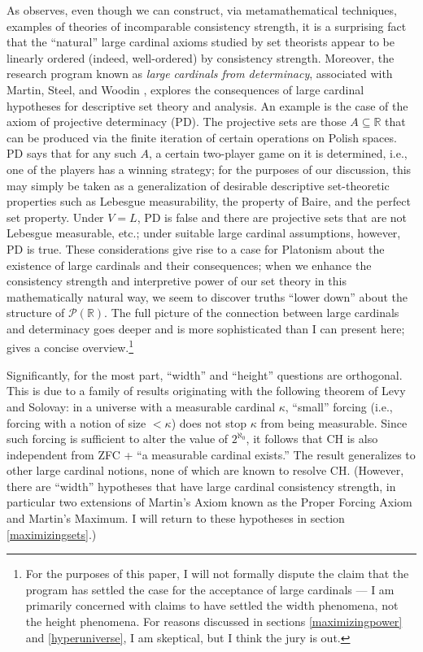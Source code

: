 \documentclass[letterpaper,12pt]{article}
\newcommand{\R}{\mathbb{R}}
\begin{document}
As \cite{sep-independence-large-cardinals} observes, even though we can construct, via metamathematical techniques, examples of theories of incomparable consistency strength, it is a surprising fact that the ``natural'' large cardinal axioms studied by set theorists appear to be linearly ordered (indeed, well-ordered) by consistency strength. Moreover, the research program known as \emph{large cardinals from determinacy}, associated with Martin, Steel, and Woodin \citep{koellner2010large}, explores the consequences of large cardinal hypotheses for descriptive set theory and analysis. An example is the case of the axiom of projective determinacy (PD). The projective sets are those $A \subseteq \R$ that can be produced via the finite iteration of certain operations on Polish spaces. PD says that for any such $A$, a certain two-player game on it is determined, i.e., one of the players has a winning strategy; for the purposes of our discussion, this may simply be taken as a generalization of desirable descriptive set-theoretic properties such as Lebesgue measurability, the property of Baire, and the perfect set property. Under $V = L$, PD is false and there are projective sets that are not Lebesgue measurable, etc.; under suitable large cardinal assumptions, however, PD is true. These considerations give rise to a case for Platonism about the existence of large cardinals and their consequences; when we enhance the consistency strength and interpretive power of our set theory in this mathematically natural way, we seem to discover truths ``lower down'' about the structure of $\mathcal{P}(\R)$. The full picture of the connection between large cardinals and determinacy goes deeper and is more sophisticated than I can present here; \cite{sep-large-cardinals-determinacy} gives a concise overview.\footnote{For the purposes of this paper, I will not formally dispute the claim that the program has settled the case for the acceptance of large cardinals --- I am primarily concerned with claims to have settled the width phenomena, not the height phenomena. For reasons discussed in sections \ref{maximizingpower} and \ref{hyperuniverse}, I am skeptical, but I think the jury is out.}

Significantly, for the most part, ``width'' and ``height'' questions are orthogonal. This is due to a family of results originating with the following theorem of Levy and Solovay: in a universe with a measurable cardinal $\kappa$, ``small'' forcing (i.e., forcing with a notion of size $< \kappa$) does not stop $\kappa$ from being measurable. Since such forcing is sufficient to alter the value of $2^{\aleph_0}$, it follows that CH is also independent from ZFC + ``a measurable cardinal exists.'' The result generalizes to other large cardinal notions, none of which are known to resolve CH. (However, there are ``width'' hypotheses that have large cardinal consistency strength, in particular two extensions of Martin's Axiom known as the Proper Forcing Axiom and Martin's Maximum. I will return to these hypotheses in section \ref{maximizingsets}.)
\end{document}
